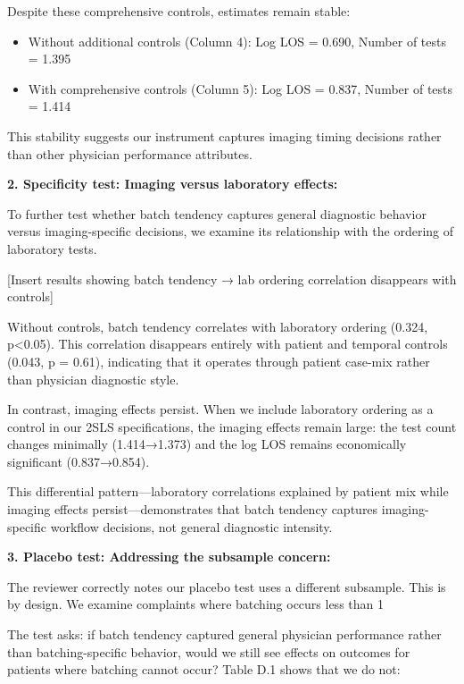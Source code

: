 \documentclass[11pt]{article}
\newcommand{\1}{\hbox{\rm 1\kern-.35em 1}}
\begin{document}
{Despite these comprehensive controls, estimates remain stable:
\begin{itemize}
\item Without additional controls (Column 4): Log LOS = 0.690, Number of tests = 1.395  
\item With comprehensive controls (Column 5): Log LOS = 0.837, Number of tests = 1.414
\end{itemize}

This stability suggests our instrument captures imaging timing decisions rather than other physician performance attributes.

\textbf{2. Specificity test: Imaging versus laboratory effects:}

To further test whether batch tendency captures general diagnostic behavior versus imaging-specific decisions, we examine its relationship with the ordering of laboratory tests.

[Insert results showing batch tendency → lab ordering correlation disappears with controls]

Without controls, batch tendency correlates with laboratory ordering (0.324, p<0.05). This correlation disappears entirely with patient and temporal controls (0.043, p = 0.61), indicating that it operates through patient case-mix rather than physician diagnostic style.

In contrast, imaging effects persist. When we include laboratory ordering as a control in our 2SLS specifications, the imaging effects remain large: the test count changes minimally (1.414→1.373) and the log LOS remains economically significant (0.837→0.854).

This differential pattern—laboratory correlations explained by patient mix while imaging effects persist—demonstrates that batch tendency captures imaging-specific workflow decisions, not general diagnostic intensity.

\textbf{3. Placebo test: Addressing the subsample concern:}

The reviewer correctly notes our placebo test uses a different subsample. This is by design. We examine complaints where batching occurs less than 1%

The test asks: if batch tendency captured general physician performance rather than batching-specific behavior, would we still see effects on outcomes for patients where batching cannot occur? Table D.1 shows that we do not:

}
\end{document}
